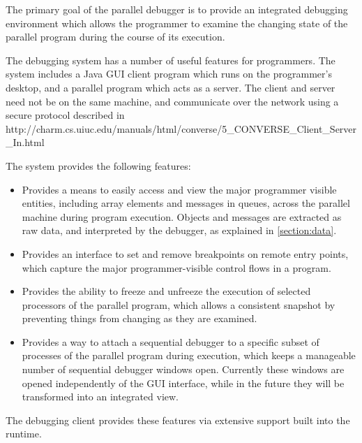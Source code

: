 
The primary goal of the parallel debugger is to provide an integrated
debugging environment which allows the programmer to examine the
changing state of the parallel program during the course of its
execution.

The \charmpp{} debugging system has a number of useful features for
\charmpp{} programmers.  The system includes a Java GUI client program
which runs on the programmer's desktop, and a \charmpp{} parallel
program which acts as a server.  The client and server need not be on
the same machine, and communicate over the network using a secure
protocol described in
 http://charm.cs.uiuc.edu/manuals/html/converse/5\_CONVERSE\_Client\_Server\_In.html 

The system provides the following features: 

\begin{itemize}

\item Provides a means to easily access and view the major programmer
visible entities, including array elements and messages in queues,
across the parallel machine during program execution. Objects and messages
are extracted as raw data, and interpreted by the debugger, as explained
in \ref{section:data}.

\item Provides an interface to set and remove breakpoints on remote
entry points, which capture the major
programmer-visible control flows in a \charmpp{} program. 

\item Provides the ability to freeze and unfreeze the execution of 
selected processors of the parallel program, which allows a 
consistent snapshot by 
preventing things from changing as they are examined.

\item Provides a way to attach a sequential debugger to a specific
subset of processes of the parallel program during execution,
which keeps a manageable number of sequential debugger windows open.
Currently these windows are opened independently of the GUI interface,
while in the future they will be transformed into an integrated view.

\end{itemize}

The debugging client provides these features via 
extensive support built into the \charmpp{} runtime.

